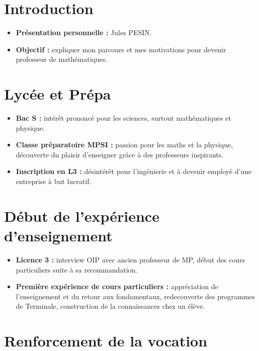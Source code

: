 \def\theme{ \large Présentation pour l'oral 2 du CAPES de mathématiques}

\section*{Introduction}

\begin{itemize}
    \item \textbf{Présentation personnelle :} Jules PESIN.
    \item \textbf{Objectif :} expliquer mon parcours et mes motivations pour devenir professeur de mathématiques.
\end{itemize}

\section{Lycée et Prépa}

\begin{itemize}
    \item \textbf{Bac S :} intérêt prononcé pour les sciences,
    surtout mathématiques et physique.
    \item \textbf{Classe préparatoire MPSI :} passion pour les maths et la physique,
    découverte du plaisir d'enseigner grâce à des professeurs inspirants.
    \item \textbf{Inscription en L3 :} désintérêt pour l'ingénierie et à devenir employé d'une entreprise à but lucratif.
\end{itemize}


\section{Début de l'expérience d'enseignement}

\begin{itemize}
    \item \textbf{Licence 3 :} interview OIP avec ancien professeur de MP,
    début des cours particuliers suite à sa recommandation.
    \item \textbf{Première expérience de cours particuliers :} appréciation de l'enseignement et du retour aux fondamentaux,
    redecouverte des programmes de Terminale,
    construction de la connaissances chez un élève.
\end{itemize}

\section{Renforcement de la vocation}


